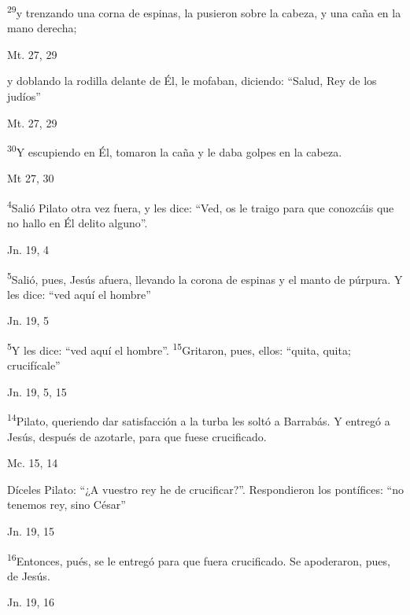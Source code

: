 \documentclass[a4paper,11pt,sans]{article}
\begin{document}
      \textsuperscript{29}y trenzando una corna de espinas, la pusieron sobre la cabeza, y una caña en la mano derecha; 
      \begin{center}
        Mt. 27, 29
      \end{center}

      y doblando la rodilla delante de Él, le mofaban, diciendo: ``Salud, Rey de los judíos''
      \begin{center}
        Mt. 27, 29
      \end{center}

      \textsuperscript{30}Y escupiendo en Él, tomaron la caña y le daba golpes en la cabeza.
      \begin{center}
        Mt 27, 30
      \end{center}

      \textsuperscript{4}Salió Pilato otra vez fuera, y les dice: ``Ved, os le traigo para que conozcáis que no hallo en Él delito alguno''.
      \begin{center}
        Jn. 19, 4
      \end{center}

      \textsuperscript{5}Salió, pues, Jesús afuera, llevando la corona de espinas y el manto de púrpura. Y les dice: ``ved aquí el hombre''
      \begin{center}
        Jn. 19, 5
      \end{center}

      \textsuperscript{5}Y les dice: ``ved aquí el hombre''. \textsuperscript{15}Gritaron, pues, ellos: ``quita, quita; crucifícale''
      \begin{center}
        Jn. 19, 5, 15
      \end{center}

      \textsuperscript{14}Pilato, queriendo dar satisfacción a la turba les soltó a Barrabás. Y entregó a Jesús, después de azotarle, para que fuese crucificado.
      \begin{center}
        Mc. 15, 14
      \end{center}

      Díceles Pilato: ``¿A vuestro rey he de crucificar?''. Respondieron los pontífices: ``no tenemos rey, sino César''
      \begin{center}
        Jn. 19, 15
      \end{center}

      \textsuperscript{16}Entonces, pués, se le entregó para que fuera crucificado. Se apoderaron, pues, de Jesús.
      \begin{center}
        Jn. 19, 16
      \end{center}
\end{document}
